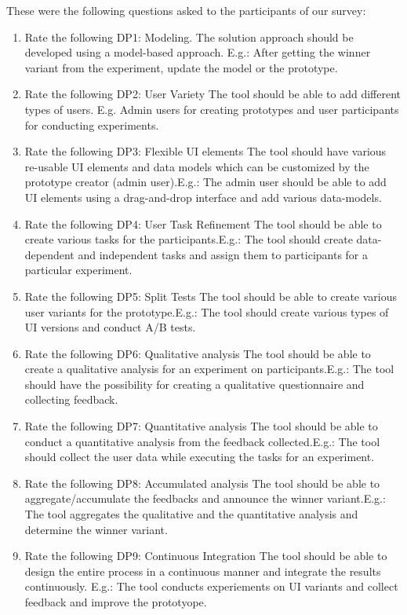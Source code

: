 These were the following questions asked to the participants of our survey:
\begin{enumerate}
    \item Rate the following DP1: Modeling. The solution approach should be developed using a model-based approach. E.g.: After getting the winner variant from the experiment, update the model or the prototype.
    \item Rate the following DP2: User Variety The tool should be able to add different types of users. E.g. Admin users for creating prototypes and user participants for conducting experiments.
    \item Rate the following DP3: Flexible UI elements The tool should have various re-usable UI elements and data models which can be customized by the prototype creator (admin user).E.g.: The admin user should be able to add UI elements using a drag-and-drop interface and add various data-models.
    \item Rate the following DP4: User Task Refinement The tool should be able to create various tasks for the participants.E.g.: The tool should create data-dependent and independent tasks and assign them to participants for a particular experiment.
    \item Rate the following DP5: Split Tests The tool should be able to create various user variants for the prototype.E.g.: The tool should create various types of UI versions and conduct A/B tests.
    \item Rate the following DP6: Qualitative analysis The tool should be able to create a qualitative analysis for an experiment on participants.E.g.: The tool should have the possibility for creating a qualitative questionnaire and collecting feedback.
    \item Rate the following DP7: Quantitative analysis The tool should be able to conduct a quantitative analysis from the feedback collected.E.g.: The tool should collect the user data while executing the tasks for an experiment.
    \item Rate the following DP8: Accumulated analysis The tool should be able to aggregate/accumulate the feedbacks and announce the winner variant.E.g.: The tool aggregates the qualitative and the quantitative analysis and determine the winner variant.
    \item Rate the following DP9: Continuous Integration The tool should be able to design the entire process in a continuous manner and integrate the results continuously. E.g.: The tool conducts experiements on UI variants and collect feedback and improve the prototyope.
\end{enumerate}
